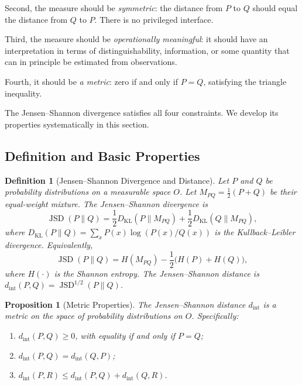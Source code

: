 \documentclass[12pt,a4paper]{article}
\newtheorem{proposition}[theorem]{Proposition}
\newtheorem{definition}[theorem]{Definition}
\theoremstyle{remark}
\theoremstyle{definition}
\begin{document}
Second, the measure should be \emph{symmetric}: the distance from $P$
to $Q$ should equal the distance from $Q$ to $P$. There is no
privileged interface.

Third, the measure should be \emph{operationally meaningful}: it should
have an interpretation in terms of distinguishability, information, or
some quantity that can in principle be estimated from observations.

Fourth, it should be \emph{a metric}: zero if and only if $P = Q$,
satisfying the triangle inequality.

The Jensen--Shannon divergence satisfies all four constraints. We develop
its properties systematically in this section.

\subsection{Definition and Basic Properties}

\begin{definition}[Jensen--Shannon Divergence and Distance]
\label{def:jsd}
Let $P$ and $Q$ be probability distributions on a measurable space $O$.
Let $M_{PQ} = \frac{1}{2}(P + Q)$ be their equal-weight mixture. The
\emph{Jensen--Shannon divergence} is
\begin{equation}
  \operatorname{JSD}(P \| Q)
  = \frac{1}{2} D_{\mathrm{KL}}(P \| M_{PQ})
    + \frac{1}{2} D_{\mathrm{KL}}(Q \| M_{PQ}),
\end{equation}
where $D_{\mathrm{KL}}(P \| Q) = \sum_x P(x) \log(P(x)/Q(x))$ is the
Kullback--Leibler divergence. Equivalently,
\begin{equation}
  \operatorname{JSD}(P \| Q)
  = H(M_{PQ}) - \frac{1}{2}\bigl(H(P) + H(Q)\bigr),
  \label{eq:jsd_entropy}
\end{equation}
where $H(\cdot)$ is the Shannon entropy. The \emph{Jensen--Shannon
distance} is $d_{\mathrm{int}}(P,Q) = \operatorname{JSD}^{1/2}(P \| Q)$.
\end{definition}

\begin{proposition}[Metric Properties]
\label{prop:metric}
The Jensen--Shannon distance $d_{\mathrm{int}}$ is a metric on the space
of probability distributions on $O$. Specifically:
\begin{enumerate}[label=(\roman*)]
  \item $d_{\mathrm{int}}(P,Q) \geq 0$, with equality if and only if $P = Q$;
  \item $d_{\mathrm{int}}(P,Q) = d_{\mathrm{int}}(Q,P)$;
  \item $d_{\mathrm{int}}(P,R) \leq d_{\mathrm{int}}(P,Q) + d_{\mathrm{int}}(Q,R)$.
\end{enumerate}
\end{proposition}
\end{document}
